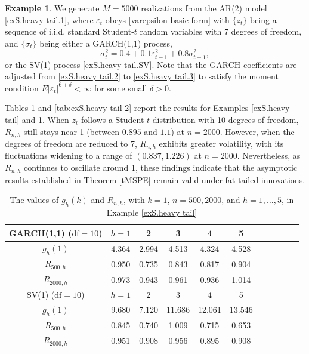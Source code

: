 \documentclass[ejsv2]{imsart}
\theoremstyle{plain}
\theoremstyle{definition}
\newtheorem{example}{Example}[section]
\theoremstyle{remark}
\begin{document}
\begin{example}\label{exS.heavy tail 2}
We generate $M=5000$ realizations from the AR(2) model \eqref{exS.heavy tail.1}, where 
$\varepsilon_t$ obeys
\eqref{varepsilon basic form} with $\{z_t\}$ being a sequence of
i.i.d. standard Student-$t$ random variables with 7 degrees of freedom, 
and $\{\sigma_t\}$ being either a GARCH(1,1) process,
\begin{equation}\label{exS.heavy tail.3}
\sigma_t^2=0.4+0.1\varepsilon_{t-1}^2+0.8\sigma_{t-1}^2,
\end{equation}
or the SV(1) process \eqref{exS.heavy tail.SV}. Note that the GARCH coefficients are adjusted from \eqref{exS.heavy tail.2} to \eqref{exS.heavy tail.3} to satisfy the moment condition $E|\varepsilon_t|^{6+\delta} < \infty$ for some small $\delta > 0$.
\end{example}

Tables \ref{tab:exS.heavy tail} and \ref{tab:exS.heavy tail 2} report the results for Examples \ref{exS.heavy tail} and \ref{exS.heavy tail 2}. When $z_t$ follows a Student-$t$ distribution with 10 degrees of freedom, $R_{n,h}$ still stays near 1 (between $0.895$ and $1.1$) at $n=2000$. However, when the degrees of freedom are reduced to 7, $R_{n,h}$ exhibits greater volatility, with its fluctuations widening to a range of $(0.837, 1.226)$ at $n=2000$. Nevertheless, as $R_{n,h}$ continues to oscillate around 1, these findings indicate that the asymptotic results established in Theorem \ref{tMSPE} remain valid under fat-tailed innovations.

\begin{table}
\caption{The values of $g_{h}(k)$ and $R_{n,h}$, with $k=1$, $n=500, 2000$, and $h=1,\ldots, 5$, in Example \ref{exS.heavy tail}}
\label{tab:exS.heavy tail}
\centering
\begin{tabular}{ccccccccccc} \hline
    GARCH(1,1) ($\textrm{df}=10$) & $h=1$ & 2 & 3 & 4 & 5 \\ \hline
    $g_{h}(1)$ & 4.364 & 2.994 & 4.513 & 4.324 & 4.528 \\ \hline
   $R_{500,h}$ & 0.950 & 0.735 & 0.843 & 0.817 & 0.904 \\
   $R_{2000,h}$ & 0.973 & 0.943 & 0.961 & 0.936 & 1.014 \\ \hline \hline
   SV(1) ($\textrm{df}=10$) & $h=1$ & 2 & 3 & 4 & 5 \\ \hline
    $g_{h}(1)$ & 9.680 & 7.120 & 11.686 & 12.061 & 13.546 \\ \hline
   $R_{500,h}$ & 0.845 & 0.740 & 1.009 & 0.715 & 0.653 \\
   $R_{2000,h}$ & 0.951 & 0.908 & 0.956 & 0.895 & 0.908 \\ \hline
  \end{tabular}
\end{table}
\end{document}
